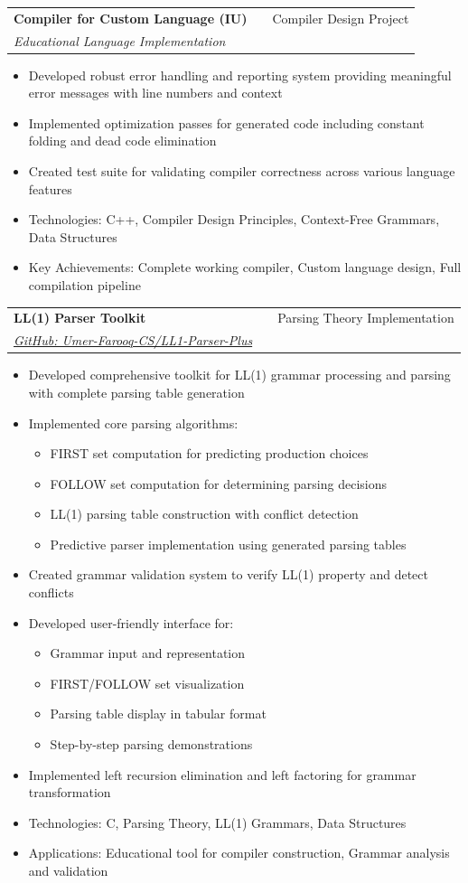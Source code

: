 \documentclass[a4paper,12pt]{article}
\makeatletter
\newenvironment{projectdetailed}[3]
    {
    \begin{tabularx}{\linewidth}{@{}l X r@{}}
    \textbf{#1} & \hfill & #2 \\
    \textit{#3} & & \\[3.75pt]
    \end{tabularx}
    \begin{minipage}[t]{\linewidth}
    \begin{itemize}[nosep,after=\strut, leftmargin=1em, itemsep=2pt,label=--]
    }
    {
    \end{itemize}
    \end{minipage}
    \vspace{6pt}
    }
\makeatother
\begin{document}
\begin{projectdetailed}{Compiler for Custom Language (IU)}{Compiler Design Project}{Educational Language Implementation}
\begin{itemize}[nosep, leftmargin=2em]
    \item Variable and function declaration tracking
\end{itemize}
\item Developed robust error handling and reporting system providing meaningful error messages with line numbers and context
\item Implemented optimization passes for generated code including constant folding and dead code elimination
\item Created test suite for validating compiler correctness across various language features
\item Technologies: C++, Compiler Design Principles, Context-Free Grammars, Data Structures
\item Key Achievements: Complete working compiler, Custom language design, Full compilation pipeline
\end{projectdetailed}

\begin{projectdetailed}{LL(1) Parser Toolkit}{Parsing Theory Implementation}{\href{https://github.com/Umer-Farooq-CS/LL1-Parser-Plus}{GitHub: Umer-Farooq-CS/LL1-Parser-Plus}}
\item Developed comprehensive toolkit for LL(1) grammar processing and parsing with complete parsing table generation
\item Implemented core parsing algorithms:
\begin{itemize}[nosep, leftmargin=2em]
    \item FIRST set computation for predicting production choices
    \item FOLLOW set computation for determining parsing decisions
    \item LL(1) parsing table construction with conflict detection
    \item Predictive parser implementation using generated parsing tables
\end{itemize}
\item Created grammar validation system to verify LL(1) property and detect conflicts
\item Developed user-friendly interface for:
\begin{itemize}[nosep, leftmargin=2em]
    \item Grammar input and representation
    \item FIRST/FOLLOW set visualization
    \item Parsing table display in tabular format
    \item Step-by-step parsing demonstrations
\end{itemize}
\item Implemented left recursion elimination and left factoring for grammar transformation
\item Technologies: C, Parsing Theory, LL(1) Grammars, Data Structures
\item Applications: Educational tool for compiler construction, Grammar analysis and validation
\end{projectdetailed}
\end{document}
